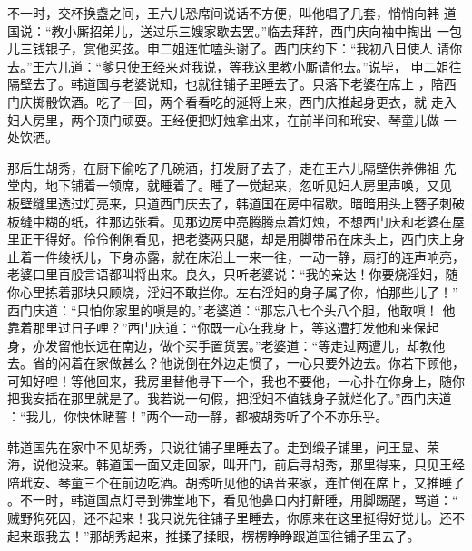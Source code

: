 不一时，交杯换盏之间，王六儿恐席间说话不方便，叫他唱了几套，悄悄向韩
道国说：“教小厮招弟儿，送过乐三嫂家歇去罢。”临去拜辞，西门庆向袖中掏出
一包儿三钱银子，赏他买弦。申二姐连忙嗑头谢了。西门庆约下：“我初八日使人
请你去。”王六儿道：“爹只使王经来对我说，等我这里教小厮请他去。”说毕，
申二姐往隔壁去了。韩道国与老婆说知，也就往铺子里睡去了。只落下老婆在席上
，陪西门庆掷骰饮酒。吃了一回，两个看看吃的涎将上来，西门庆推起身更衣，就
走入妇人房里，两个顶门顽耍。王经便把灯烛拿出来，在前半间和玳安、琴童儿做
一处饮酒。

那后生胡秀，在厨下偷吃了几碗酒，打发厨子去了，走在王六儿隔壁供养佛祖
先堂内，地下铺着一领席，就睡着了。睡了一觉起来，忽听见妇人房里声唤，又见
板壁缝里透过灯亮来，只道西门庆去了，韩道国在房中宿歇。暗暗用头上簪子刺破
板缝中糊的纸，往那边张看。见那边房中亮腾腾点着灯烛，不想西门庆和老婆在屋
里正干得好。伶伶俐俐看见，把老婆两只腿，却是用脚带吊在床头上，西门庆上身
止着一件绫袄儿，下身赤露，就在床沿上一来一往，一动一静，扇打的连声响亮，
老婆口里百般言语都叫将出来。良久，只听老婆说：“我的亲达！你要烧淫妇，随
你心里拣着那块只顾烧，淫妇不敢拦你。左右淫妇的身子属了你，怕那些儿了！”
西门庆道：“只怕你家里的嗔是的。”老婆道：“那忘八七个头八个胆，他敢嗔！
他靠着那里过日子哩？”西门庆道：“你既一心在我身上，等这遭打发他和来保起
身，亦发留他长远在南边，做个买手置货罢。”老婆道：“等走过两遭儿，却教他
去。省的闲着在家做甚么？他说倒在外边走惯了，一心只要外边去。你若下顾他，
可知好哩！等他回来，我房里替他寻下一个，我也不要他，一心扑在你身上，随你
把我安插在那里就是了。我若说一句假，把淫妇不值钱身子就烂化了。”西门庆道
：“我儿，你快休赌誓！”两个一动一静，都被胡秀听了个不亦乐乎。

韩道国先在家中不见胡秀，只说往铺子里睡去了。走到缎子铺里，问王显、荣
海，说他没来。韩道国一面又走回家，叫开门，前后寻胡秀，那里得来，只见王经
陪玳安、琴童三个在前边吃酒。胡秀听见他的语音来家，连忙倒在席上，又推睡了
。不一时，韩道国点灯寻到佛堂地下，看见他鼻口内打鼾睡，用脚踢醒，骂道：“
贼野狗死囚，还不起来！我只说先往铺子里睡去，你原来在这里挺得好觉儿。还不
起来跟我去！”那胡秀起来，推揉了揉眼，楞楞睁睁跟道国往铺子里去了。

